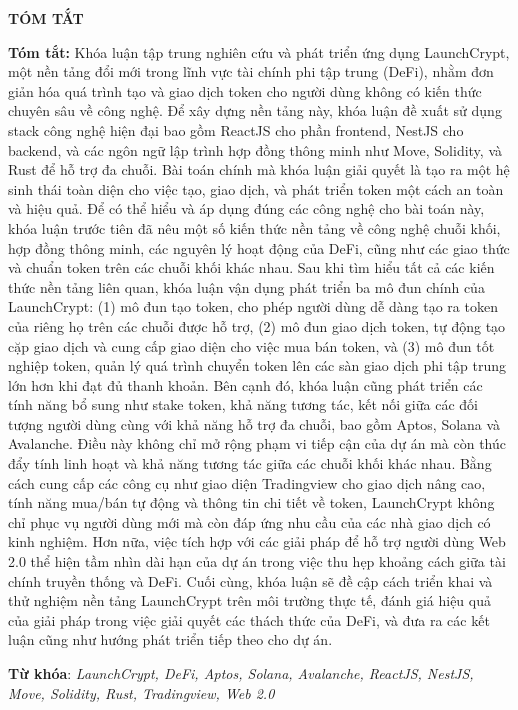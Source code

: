 \begin{center}
  \textbf{\large{TÓM TẮT}	}
\end{center}


\begin{small}

  \textbf{Tóm tắt:} Khóa luận tập trung nghiên cứu và phát triển ứng dụng
  LaunchCrypt,
  một nền tảng đổi mới trong lĩnh vực tài chính phi tập trung (DeFi), nhằm đơn
  giản hóa
  quá trình tạo và giao dịch token cho người dùng không có kiến thức chuyên sâu
  về
  công nghệ. Để xây dựng nền tảng này, khóa luận đề xuất sử dụng stack công
  nghệ hiện
  đại bao gồm ReactJS cho phần frontend, NestJS cho backend, và các ngôn ngữ
  lập
  trình hợp đồng thông minh như Move, Solidity, và Rust để hỗ trợ đa chuỗi. Bài toán
  chính mà
  khóa luận giải quyết là tạo ra một hệ sinh thái toàn diện cho việc tạo, giao
  dịch, và
  phát triển token một cách an toàn và hiệu quả. Để có thể hiểu và áp dụng đúng
  các
  công nghệ cho bài toán này, khóa luận trước tiên đã nêu một số kiến thức nền
  tảng về
  công nghệ chuỗi khối, hợp đồng thông minh, các nguyên lý hoạt động của DeFi, cũng như các
  giao thức
  và chuẩn token trên các chuỗi khối khác nhau. Sau khi tìm hiểu tất cả các
  kiến thức
  nền tảng liên quan, khóa luận vận dụng phát triển ba mô đun chính của
  LaunchCrypt:
  (1) mô đun tạo token, cho phép người dùng dễ dàng tạo ra token của riêng họ
  trên các
  chuỗi được hỗ trợ, (2) mô đun giao dịch token, tự động tạo cặp giao dịch
  và cung
  cấp giao diện cho việc mua bán token, và (3) mô đun tốt nghiệp token, quản lý
  quá
  trình chuyển token lên các sàn giao dịch phi tập trung lớn hơn khi đạt đủ
  thanh khoản.
  Bên cạnh đó, khóa luận cũng phát triển các tính năng bổ sung như stake token,
  khả năng tương tác, kết nối giữa các đối tượng người dùng cùng với khả năng hỗ
  trợ đa chuỗi, bao gồm Aptos, Solana và Avalanche. Điều này không chỉ mở rộng
  phạm vi tiếp cận của dự án mà còn thúc đẩy tính linh hoạt và khả năng tương tác
  giữa các chuỗi khối khác nhau. Bằng
  cách cung cấp các công cụ như giao diện Tradingview cho giao dịch nâng cao,
  tính năng
  mua/bán tự động và thông tin chi tiết về token, LaunchCrypt không chỉ phục vụ
  người
  dùng mới mà còn đáp ứng nhu cầu của các nhà giao dịch có kinh nghiệm. Hơn
  nữa,
  việc tích hợp với các giải pháp để hỗ trợ người dùng Web 2.0 thể hiện tầm
  nhìn dài hạn
  của dự án trong việc thu hẹp khoảng cách giữa tài chính truyền thống và DeFi.
  Cuối
  cùng, khóa luận sẽ đề cập cách triển khai và thử nghiệm nền tảng LaunchCrypt
  trên
  môi trường thực tế, đánh giá hiệu quả của giải pháp trong việc giải quyết các
  thách
  thức của DeFi, và đưa ra các kết luận cũng như hướng phát triển tiếp theo cho
  dự án.

  \textbf{Từ khóa}: \textit{LaunchCrypt, DeFi, Aptos, Solana,
    Avalanche, ReactJS, NestJS, Move, Solidity, Rust, Tradingview, Web 2.0}


\end{small}